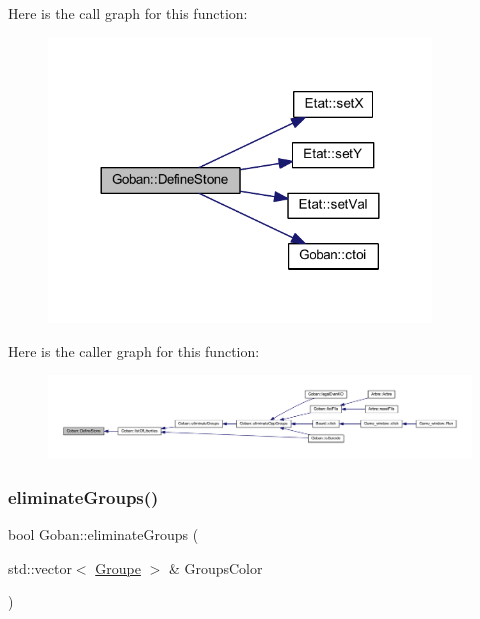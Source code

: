 Here is the call graph for this function\+:
\nopagebreak
\begin{figure}[H]
\begin{center}
\leavevmode
\includegraphics[width=288pt]{class_goban_a0e2596110cdbb9b007b2b2fd8d5a9973_cgraph}
\end{center}
\end{figure}
Here is the caller graph for this function\+:
\nopagebreak
\begin{figure}[H]
\begin{center}
\leavevmode
\includegraphics[width=350pt]{class_goban_a0e2596110cdbb9b007b2b2fd8d5a9973_icgraph}
\end{center}
\end{figure}
\mbox{\label{class_goban_a1ec70508987f66afff5f8df381731fac}} 
\subsubsection{\texorpdfstring{eliminate\+Groups()}{eliminateGroups()}}
{\footnotesize\ttfamily bool Goban\+::eliminate\+Groups (\begin{DoxyParamCaption}\item[{std\+::vector$<$ \hyperlink{class_groupe}{Groupe} $>$ \&}]{Groups\+Color }\end{DoxyParamCaption})}

